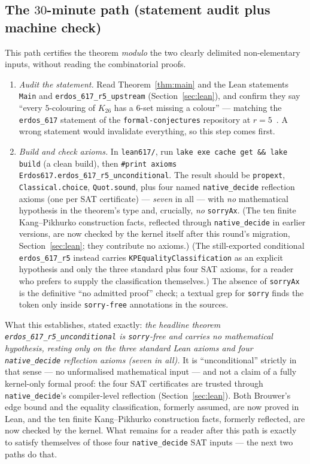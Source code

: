 \documentclass[11pt,reqno]{amsart}
\theoremstyle{definition}
\theoremstyle{remark}
\begin{document}
\subsection*{The $30$-minute path (statement audit plus machine check)}
This path certifies the theorem \emph{modulo} the two clearly delimited
non-elementary inputs, without reading the combinatorial proofs.
\begin{enumerate}[label=\textup{(\arabic*)},leftmargin=2.2em]
\item \emph{Audit the statement.} Read Theorem~\ref{thm:main} and the Lean statements
\texttt{Main} and \texttt{erdos\_617\_r5\_\allowbreak upstream} (Section~\ref{sec:lean}), and
confirm they say ``every $5$-colouring of $K_{26}$ has a $6$-set missing a colour'' ---
matching the \texttt{erdos\_617} statement of the \texttt{formal-conjectures}
repository at $r=5$~\cite{FC}. A wrong statement would invalidate everything, so this
step comes first.
\item \emph{Build and check axioms.} In \texttt{lean617/}, run \texttt{lake exe cache
get \&\& lake build} (a clean build), then \texttt{\#print axioms
Erdos617.erdos\_617\_r5\_\allowbreak unconditional}. The result should be
\texttt{propext}, \texttt{Classical.choice}, \texttt{Quot.sound}, plus four named
\texttt{native\_decide} reflection axioms (one per SAT certificate) --- \emph{seven} in
all --- with \emph{no} mathematical hypothesis in the theorem's type and, crucially,
\emph{no} \texttt{sorryAx}. (The ten finite Kang--Pikhurko construction facts, reflected
through \texttt{native\_decide} in earlier versions, are now checked by the kernel itself
after this round's migration, Section~\ref{sec:lean}; they contribute no axioms.) (The
still-exported conditional \texttt{erdos\_617\_r5} instead
carries \texttt{KPEqualityClassification} as an explicit hypothesis and only the three
standard plus four SAT axioms, for a reader who prefers to supply the classification
themselves.) The absence of \texttt{sorryAx} is the definitive ``no admitted proof''
check; a textual grep for \texttt{sorry} finds the token only inside
\texttt{sorry-free} annotations in the sources.
\end{enumerate}
What this establishes, stated exactly: \emph{the headline theorem
\texttt{erdos\_617\_r5\_unconditional} is \texttt{sorry}-free and carries no
mathematical hypothesis, resting only on the three standard Lean axioms and four
\texttt{native\_decide} reflection axioms (seven in all).} It is
``unconditional'' strictly in that sense --- no unformalised mathematical input ---
and not a claim of a fully kernel-only formal proof: the four SAT certificates are
trusted through \texttt{native\_decide}'s compiler-level reflection
(Section~\ref{sec:lean}). Both Brouwer's edge bound and the equality classification,
formerly assumed, are now proved in Lean, and the ten finite Kang--Pikhurko construction
facts, formerly reflected, are now checked by the kernel. What remains for a reader after
this path is exactly to satisfy themselves of those four \texttt{native\_decide} SAT
inputs --- the next two paths do that.
\end{document}
